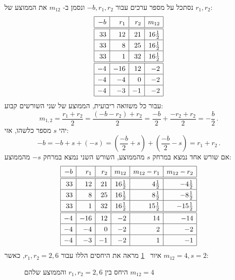 נסתכל על מספר ערכים עבור
$-b,r_1,r_2$
ונסמן ב-%
$m_{12}$
את הממוצע של
$r_1,r_2$:
\[
\renewcommand{\arraystretch}{1.3}
\begin{array}{|r|r|r|r|}
\hline
-b& r_1 & r_2 &m_{12}\\\hline
\hline
33 & 12 & 21 & 16\frac{1}{2}\\\hline
33 & 8 & 25 & 16\frac{1}{2}\\\hline
33 & 1 & 32 & 16\frac{1}{2}\\\hline
\hline
-4 & -16 & 12 & -2 \\\hline
-4 & -4 & 0 & -2 \\\hline
-4 & -3 & -1 & -2 \\\hline
\end{array}
\]
עבור כל משוואה ריבועית, הממוצע של שני השורשים קבוע:
\[
m_{1,2}=\frac{r_1+r_2}{2}=
\frac{(-b-r_2)+r_2}{2}=
\frac{-b}{2}+\frac{-r_2+r_2}{2}=
-\frac{b}{2}\,.
\]
יהי 
$s$ 
מספר כלשהו, אזי:
\[
-b=-b+s+(-s)=\left(\frac{-b}{2}+s\right) + \left(\frac{-b}{2}-s\right)=r_1+r_2\,.
\]
אם שורש אחד נמצא במרחק
$s$
מהממוצע, השורש השני נמצא במרחק
$-s$
מהממוצע:
\[
\renewcommand{\arraystretch}{1.3}
\begin{array}{|r|r|r|r|r|r|}
\hline
-b& r_1 & r_2 & m_{12}& m_{12}-r_1 & m_{12}-r_2\\\hline\hline
33 & 12 & 21 & 16\frac{1}{2}&4\frac{1}{2} & -4\frac{1}{2}  \\\hline
33 & 8 & 25 & 16\frac{1}{2}&8\frac{1}{2}&-8\frac{1}{2}\\\hline
33 & 1 & 32 & 16\frac{1}{2}&15\frac{1}{2}&-15\frac{1}{2}\\\hline
\hline
-4 & -16 & 12 & -2 &14& -14\\\hline
-4 & -4 & 0 & -2&2&-2 \\\hline
-4 & -3 & -1 & -2&1&-1 \\\hline
\end{array}
\]
איור%
~\ref{f.loh-roots1}
מראה את היחסים הללו עבור
$r_1,r_2=2,6$,
כאשר
$m_{12}=4, s=2$:
\begin{figure}[htb]
\begin{center}
\end{center}
\caption{היחס בין 
$r_1,r_2=2,6$
והממוצע שלהם
$m_{12}=4$}
\label{f.loh-roots1}
\end{figure}
